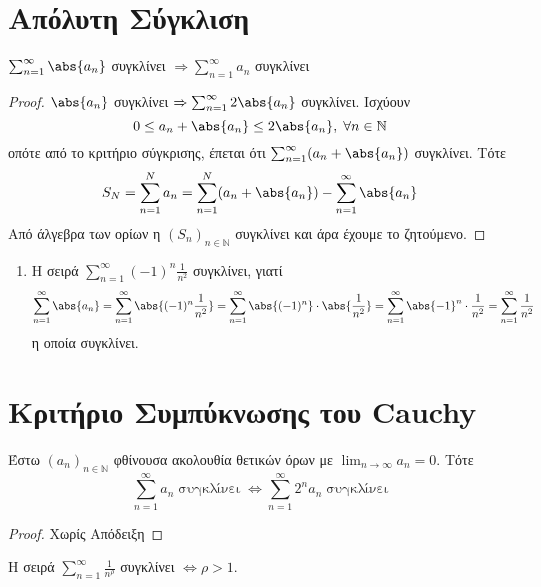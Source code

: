 \documentclass[main.tex]{subfiles}
\begin{document}
\section{Απόλυτη Σύγκλιση}

\begin{prop}
    $ \sum_{n=1}^{\infty} \abs{a_{n}} $ συγκλίνει 
    $ \Rightarrow \sum_{n=1}^{\infty} a_{n} $ συγκλίνει 
\end{prop}
\begin{proof}
    $ \abs{a_{n}} $ συγκλίνει $ \Rightarrow \sum_{n=1}^{\infty} 2 \abs{a_{n}} $ 
    συγκλίνει. Ισχύουν
    \[
        0 \leq a_{n} + \abs{a_{n}} \leq 2 \abs{a_{n}}, \; \forall n \in \mathbb{N} 
     \] 
     οπότε από το κριτήριο σύγκρισης, έπεται ότι $ \sum_{n=1}^{\infty} (a_{n}+ 
     \abs{a_{n}}) $ συγκλίνει. Τότε
     \[
         S_{N} = \sum_{n=1}^{N} a_{n} = \sum_{n=1}^{N} (a_{n}+ \abs{a_{n}}) - 
         \sum_{n=1}^{\infty} \abs{a_{n}}   
      \] 
      Από άλγεβρα των ορίων η $ {(S_{n})}_{n \in \mathbb{N}} $ συγκλίνει και άρα 
      έχουμε το ζητούμενο.
\end{proof}

\begin{examples}
\item {}
    \begin{enumerate}
        \item Η σειρά $ \sum_{n=1}^{\infty} (-1)^{n} \frac{1}{n^{2}} $ συγκλίνει, 
            γιατί 
            \[ 
                \sum_{n=1}^{\infty} \abs{a_{n}} = \sum_{n=1}^{\infty} \abs{(-1)^{n}
                \frac{1}{n^{2}}} = \sum_{n=1}^{\infty} \abs{(-1)^{n}} 
                \cdot \abs{\frac{1}{n^{2}} } =  
                \sum_{n=1}^{\infty} \abs{-1}^{n} \cdot 
                \frac{1}{n^{2}} = \sum_{n=1}^{\infty} \frac{1}{n^{2}} 
            \]
            η οποία συγκλίνει.
    \end{enumerate}
\end{examples}

\section{Κριτήριο Συμπύκνωσης του Cauchy}

\begin{prop}
    Έστω $ {(a_{n})}_{n \in \mathbb{N}} $ φθίνουσα ακολουθία θετικών όρων με 
    $ \lim_{n \to \infty} a_{n} =0 $. Τότε
    \[
        \sum_{n=1}^{\infty} a_{n} \; \text{συγκλίνει} \; 
        \Leftrightarrow \sum_{n=1}^{\infty} 2^{n} a_{n} \; \text{συγκλίνει}
    \] 
\end{prop}
\begin{proof}
    Χωρίς Απόδειξη
\end{proof}

\begin{cor}
    Η σειρά $ \sum_{n=1}^{\infty} \frac{1}{n^{\rho}} $ συγκλίνει $ \Leftrightarrow 
    \rho > 1$.
\end{cor}
\end{document}
